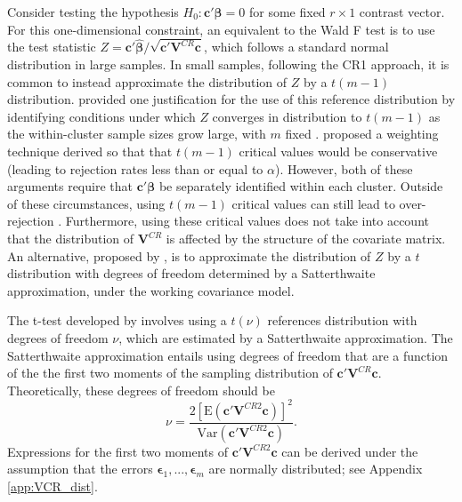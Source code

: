 \documentclass[12pt]{article}
\newcommand{\E}{\text{E}}
\newcommand{\Var}{\text{Var}}
\newcommand{\bm}{\mathbf}
\newcommand{\bs}{\boldsymbol}
\begin{document}
Consider testing the hypothesis $H_0: \bm{c}'\bs\beta = 0$ for some fixed $r \times 1$ contrast vector. 
For this one-dimensional constraint, an equivalent to the Wald F test is to use the test statistic $Z = \bm{c}'\bs{\hat\beta} / \sqrt{\bm{c}'\bm{V}^{CR}\bm{c}}$, which follows a standard normal distribution in large samples. 
In small samples, following the CR1 approach, it is common to instead approximate the distribution of $Z$ by a $t(m - 1)$ distribution. 
\citet{Hansen2007asymptotic} provided one justification for the use of this reference distribution by identifying conditions under which $Z$ converges in distribution to $t(m-1)$ as the within-cluster sample sizes grow large, with $m$ fixed \citep[see also][]{Donald2007inference}. 
\citet{Ibragimov2010tstatistic} proposed a weighting technique derived so that that $t(m-1)$ critical values would be conservative (leading to rejection rates less than or equal to $\alpha$).
However, both of these arguments require that $\bm{c}'\bs\beta$ be separately identified within each cluster. 
Outside of these circumstances, using $t(m-1)$ critical values can still lead to over-rejection \citep{Cameron2015practitioners}. 
Furthermore, using these critical values does not take into account that the distribution of $\bm{V}^{CR}$ is affected by the structure of the covariate matrix. 
An alternative, proposed by \citet{Bell2002bias}, is to approximate the distribution of $Z$ by a $t$ distribution with degrees of freedom determined by a Satterthwaite approximation, under the working covariance model.

The t-test developed by \citet{Bell2002bias} involves using a $t(\nu)$ references distribution with degrees of freedom $\nu$, which are estimated by a Satterthwaite approximation.
The Satterthwaite approximation \citep{Satterthwaite1946approximate} entails using degrees of freedom that are a function of the the first two moments of the sampling distribution of $\bm{c}' \bm{V}^{CR} \bm{c}$.
Theoretically, these degrees of freedom should be 
\begin{equation}
\label{eq:nu_Satterthwaite}
\nu = \frac{2\left[\E\left(\bm{c}'\bm{V}^{CR2}\bm{c}\right)\right]^2}{\Var\left(\bm{c}'\bm{V}^{CR2}\bm{c}\right)}.
\end{equation}
Expressions for the first two moments of $\bm{c}'\bm{V}^{CR2}\bm{c}$ can be derived under the assumption that the errors $\bs\epsilon_1,...,\bs\epsilon_m$ are normally distributed; see Appendix \ref{app:VCR_dist}. 
\end{document}
